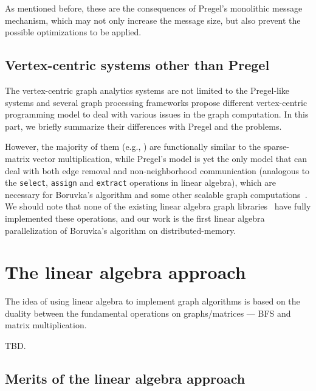 \documentclass{sokendai_thesis} %
\newcommand{\boruvka}[0]{Boruvka}
\begin{document}
As mentioned before, these are the consequences of Pregel's monolithic message mechanism, which may not only increase the message size, but also prevent the possible optimizations to be applied.

\subsection{Vertex-centric systems other than Pregel}

The vertex-centric graph analytics systems are not limited to the Pregel-like systems and several graph processing frameworks propose different vertex-centric programming model to deal with various issues in the graph computation. 
In this part, we briefly summarize their differences with Pregel and the problems.

However, the majority of them (e.g., \cite{low2012distributed,powergraph,powerlyra,graphmat,gemini,dathathri2018gluon}) are functionally similar to the sparse-matrix vector multiplication, while Pregel's model is yet the only model that can deal with both edge removal and non-neighborhood communication (analogous to the \texttt{select}, \texttt{assign} and \texttt{extract} operations in linear algebra), which are necessary for \boruvka{}'s algorithm and some other scalable graph computations~\cite{fastsv,lacc,salihoglu2014help}.
We should note that none of the existing linear algebra graph libraries~\cite{combblas,graphpad,graphmat} have fully implemented these operations, and our work is the first linear algebra parallelization of \boruvka{}'s algorithm on distributed-memory.



\section{The linear algebra approach}


The idea of using linear algebra to implement graph algorithms is based on the duality between the fundamental operations on graphs/matrices — BFS and matrix multiplication.

TBD.


\subsection{Merits of the linear algebra approach}
\end{document}
